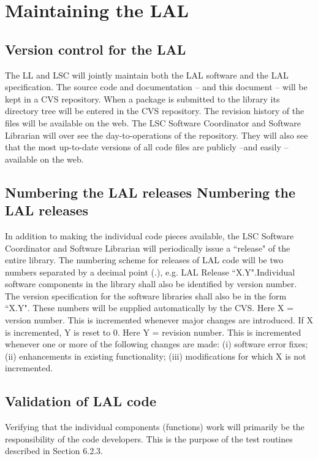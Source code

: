 \documentclass[]{ligodcc}
\begin{document}
\section{Maintaining the LAL}
\label{sec:lalmaint}

\subsection{Version control for the LAL}

The LL and LSC will jointly maintain both the LAL software and the LAL
specification. The source code and documentation -- and this document
-- will be kept in a CVS repository. When a package is submitted to
the library its directory tree will be entered in the CVS repository.
The revision history of the files will be available on the web. The
LSC Software Coordinator and Software Librarian will over see the
day-to-operations of the repository. They will also see that the  most
up-to-date versions of all code files are  publicly --and easily --
available on the web. 

\subsection{Numbering the LAL releases Numbering the LAL releases}

In addition to making the individual code pieces available, the LSC
Software Coordinator and Software Librarian will periodically issue a
``release" of the entire library. The numbering scheme for releases of
LAL code will be two numbers separated by a decimal point (.), e.g.
LAL Release ``X.Y".Individual software components in the library shall
also be identified by version number.  The version specification for
the software libraries shall also be in the form ``X.Y". These numbers
will be supplied automatically by the CVS. Here X = version number.
This is incremented whenever major changes are introduced. If X is
incremented, Y is reset to 0. Here Y = revision number. This is
incremented whenever one or more of the following changes are made:
(i) software error fixes; (ii) enhancements in existing
functionality; (iii) modifications for which  X is not incremented.

\subsection{Validation of LAL code}

Verifying that the individual components (functions) work will
primarily be the responsibility of the code developers.  This is the
purpose of the test routines described in Section 6.2.3.
\end{document}

